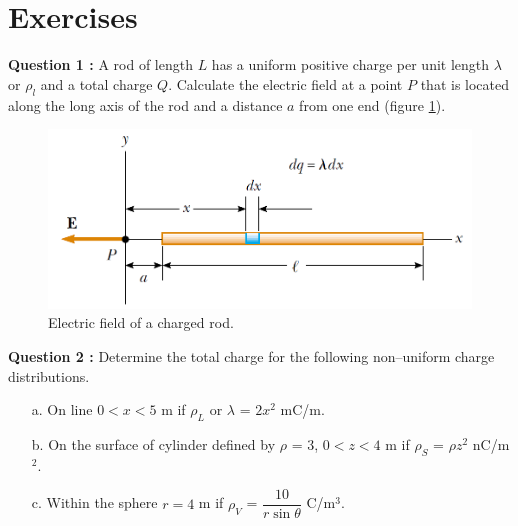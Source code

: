 \documentclass[12pt,a4paper]{article}
\begin{document}
\section{Exercises}
\noindent\textbf{Question 1 \cite[Example 23.7, page 721]{Serway}:} A rod of length $L$ has a uniform positive charge per unit length $\lambda$ or $\rho_l$ and a total charge $Q$. Calculate the electric field at a point $P$ that is located along the long axis of the rod and a distance $a$ from one end (figure \ref{electric-field-charged-rod}).
\begin{figure}[H]
\centering
\includegraphics[scale=0.45]{Figure23-17.png}
\caption{Electric field of a charged rod.}
\label{electric-field-charged-rod}
\end{figure}
\noindent\textbf{Question 2 \cite[Problem 4.5, page 155]{Sadiku}:} Determine the total charge for the following non--uniform charge distributions.
\begin{itemize}
\item[a.] On line $0 < x < 5$ m if $\rho_L$ or $\lambda$ = $2x^2$ mC/m.
\item[b.] On the surface of cylinder defined by $\rho$ = 3, $0 < z < 4$ m if $\rho_S$ = $\rho z^2$ nC/m$^2$.
\item[c.] Within the sphere $r = 4$ m if $\rho_V$ = $\dfrac{10}{r\sin\theta}$ C/m$^3$.
\end{itemize}


\end{document}
